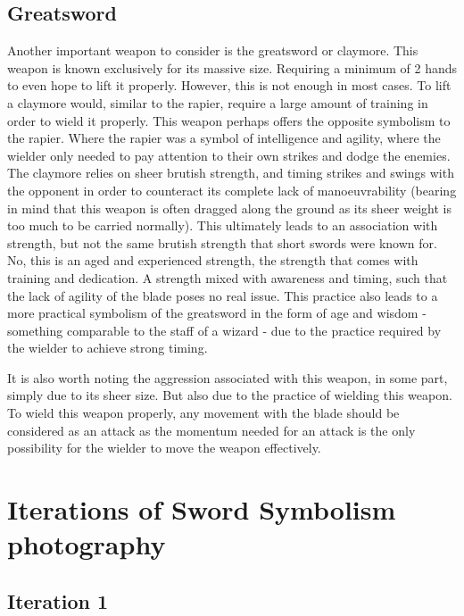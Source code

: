 \documentclass{article}
\begin{document}
\subsection{Greatsword} \label{greatswordSymbol}
Another important weapon to consider is the greatsword or claymore. This weapon is known exclusively for its massive size. Requiring a minimum of 2 hands to even hope to lift it properly. However, this is not enough in most cases. To lift a claymore would, similar to the rapier, require a large amount of training in order to wield it properly. This weapon perhaps offers the opposite symbolism to the rapier. Where the rapier was a symbol of intelligence and agility, where the wielder only needed to pay attention to their own strikes and dodge the enemies. The claymore relies on sheer brutish strength, and timing strikes and swings with the opponent in order to counteract its complete lack of manoeuvrability (bearing in mind that this weapon is often dragged along the ground as its sheer weight is too much to be carried normally). This ultimately leads to an association with strength, but not the same brutish strength that short swords were known for. No, this is an aged and experienced strength, the strength that comes with training and dedication. A strength mixed with awareness and timing, such that the lack of agility of the blade poses no real issue. This practice also leads to a more practical symbolism of the greatsword in the form of age and wisdom - something comparable to the staff of a wizard - due to the practice required by the wielder to achieve strong timing.

It is also worth noting the aggression associated with this weapon, in some part, simply due to its sheer size. But also due to the practice of wielding this weapon. To wield this weapon properly, any movement with the blade should be considered as an attack as the momentum needed for an attack is the only possibility for the wielder to move the weapon effectively.

\pagebreak

\section{Iterations of Sword Symbolism photography}

\subsection{Iteration 1} \label{Iteration1}
\end{document}
